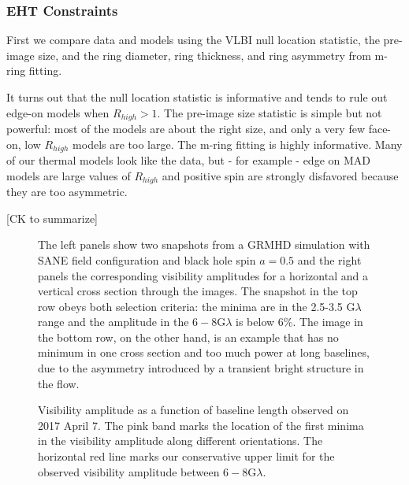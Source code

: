 \subsubsection{EHT Constraints}

First we compare data and models using the VLBI null location statistic, the pre-image size, and the ring diameter, ring thickness, and ring asymmetry from m-ring fitting.

It turns out that the null location statistic is informative and tends to rule out edge-on models when $R_{high} > 1$.  The pre-image size statistic is simple but not powerful: most of the models are about the right size, and only a very few face-on, low $R_{high}$ models are too large.   The m-ring fitting is highly informative.  Many of our thermal models look like the data, but - for example - edge on MAD models are large values of $R_{high}$ and positive spin are strongly disfavored because they are too asymmetric.


[CK to summarize]


\begin{figure}
  \centering
  [altex]
  \caption{The left panels show two snapshots from a GRMHD simulation
    with SANE field configuration and black hole spin $a=0.5$ and the
    right panels the corresponding visibility amplitudes for a
    horizontal and a vertical cross section through the images.
    The snapshot in the top row obeys both selection criteria: the
    minima are in the 2.5-3.5 G$\lambda$ range and the amplitude in
    the $6-8$G$\lambda$ is below 6\%.
    The image in the bottom row, on the other hand, is an example that
    has no minimum in one cross section and too much power at long
    baselines, due to the asymmetry introduced by a transient bright
    structure in the flow.}
  \label{fig:cmp_VA}
\end{figure}

\begin{figure}
  \centering
  [altex]
  \caption{Visibility amplitude as a function of baseline length
    observed on 2017 April 7.
    The pink band marks the location of the first minima in the
    visibility amplitude along different orientations.
    The horizontal red line marks our conservative upper limit for the
    observed visibility amplitude between $6-8$G$\lambda$.}
  \label{fig:cmp_null}
\end{figure}

